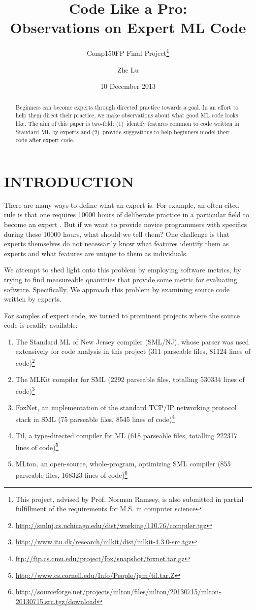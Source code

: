 \documentclass[12pt,abstracton]{scrartcl}
\title{Code Like a Pro:\\Observations on Expert ML Code}
\subtitle{Comp150FP Final Project\footnote{This project, advised by Prof. Norman Ramsey, is also submitted in partial fulfillment of the requirements for M.S. in computer science}}
\author{Zhe Lu}
\date{10 December 2013}
\begin{document}


\maketitle
\begin{abstract}
Beginners can become experts through directed practice towards a goal. In an effort to
help them direct their practice, we make observations about what good ML code looks like.
The aim of this paper is two-fold: (1)~identify features common to code written in Standard ML by experts and
(2)~provide suggestions to help beginners model their code after expert code.
\end{abstract}
\section{INTRODUCTION}
There are many ways to define what an expert is.
For example, an often cited rule is that one requires 10000 hours of deliberate practice
in a particular field to become an expert \cite{Gla08}. But if we want to provide novice programmers
with specifics during these 10000 hours, what should we tell them? One challenge is that experts themselves
do not necessarily know what features identify them as experts and what features are unique to them as individuals.

We attempt to shed light onto this problem by employing software metrics,
by trying to find measureable quantities
that provide some metric for evaluating software. Specifically,
We approach this problem by examining source code written by experts.

For samples of expert code, we turned to prominent projects where the source code is readily available:
\begin{enumerate}
\item The Standard ML of New Jersey compiler (SML/NJ), whose parser was used extensively for code analysis in this project (311 parseable files, 81124 lines of code)\footnote{\url{http://smlnj.cs.uchicago.edu/dist/working/110.76/compiler.tgz}}
\item The MLKit compiler for SML (2292 parseable files, totalling 530334 lines of code)\footnote{\url{http://www.itu.dk/research/mlkit/dist/mlkit-4.3.0-src.tgz}}
\item FoxNet, an implementation of the standard TCP/IP networking protocol stack in SML (75 parseable files, 8545 lines of code)\footnote{\url{ftp://ftp.cs.cmu.edu/project/fox/snapshot/foxnet.tar.gz}}
\item Til, a type-directed compiler for ML (618 parseable files, totalling 222317 lines of code)\footnote{\url{http://www.cs.cornell.edu/Info/People/jgm/til.tar.Z}}
\item MLton, an open-source, whole-program, optimizing SML compiler (855 parseable files, 168323 lines of code)\footnote{\url{http://sourceforge.net/projects/mlton/files/mlton/20130715/mlton-20130715.src.tgz/download}}
\end{enumerate}
\end{document}
